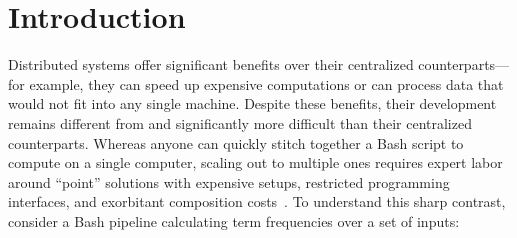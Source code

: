 \documentclass[sigplan,10pt,review,anonymous]{acmart}
\begin{document}




\maketitle


\section{Introduction}
\label{intro}

% 

Distributed systems offer significant benefits over their centralized counterparts---for example, they can speed up expensive computations or can process data that would not fit into any single machine.
Despite these benefits, their development remains different from and significantly more difficult than their centralized counterparts.
Whereas anyone can quickly stitch together a Bash script to compute on a single computer, 
   scaling out to multiple ones requires expert labor around ``point'' solutions with expensive setups, restricted programming interfaces, and exorbitant composition costs~\cite{taurus:14, dios:13, andromeda:15, pywren:17, futuredata:18, nefele:18}.
% 
To understand this sharp contrast, consider a Bash pipeline calculating term frequencies over a set of inputs:
\end{document}
